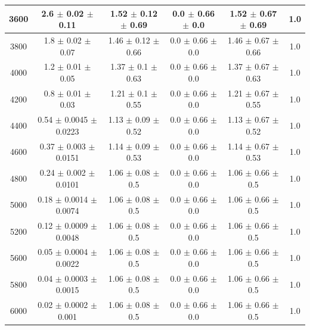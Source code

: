 \begin{table}[htp]
{\begin{tabular}{|c|c|c|c|c|c|}
			3600 & 2.6 $\pm$ 0.02 $\pm$ 0.11 & 1.52 $\pm$ 0.12 $\pm$ 0.69 & 0.0 $\pm$ 0.66 $\pm$ 0.0 & 1.52 $\pm$ 0.67 $\pm$ 0.69 & 1.0     \\ \hline
			3800 & 1.8 $\pm$ 0.02 $\pm$ 0.07 & 1.46 $\pm$ 0.12 $\pm$ 0.66 & 0.0 $\pm$ 0.66 $\pm$ 0.0 & 1.46 $\pm$ 0.67 $\pm$ 0.66 & 1.0     \\ \hline
			4000 & 1.2 $\pm$ 0.01 $\pm$ 0.05 & 1.37 $\pm$ 0.1 $\pm$ 0.63 & 0.0 $\pm$ 0.66 $\pm$ 0.0 & 1.37 $\pm$ 0.67 $\pm$ 0.63 & 1.0     \\ \hline
			4200 & 0.8 $\pm$ 0.01 $\pm$ 0.03 & 1.21 $\pm$ 0.1 $\pm$ 0.55 & 0.0 $\pm$ 0.66 $\pm$ 0.0 & 1.21 $\pm$ 0.67 $\pm$ 0.55 & 1.0     \\ \hline
			4400 & 0.54 $\pm$ 0.0045 $\pm$ 0.0223 & 1.13 $\pm$ 0.09 $\pm$ 0.52 & 0.0 $\pm$ 0.66 $\pm$ 0.0 & 1.13 $\pm$ 0.67 $\pm$ 0.52 & 1.0     \\ \hline
			4600 & 0.37 $\pm$ 0.003 $\pm$ 0.0151 & 1.14 $\pm$ 0.09 $\pm$ 0.53 & 0.0 $\pm$ 0.66 $\pm$ 0.0 & 1.14 $\pm$ 0.67 $\pm$ 0.53 & 1.0     \\ \hline
			4800 & 0.24 $\pm$ 0.002 $\pm$ 0.0101 & 1.06 $\pm$ 0.08 $\pm$ 0.5 & 0.0 $\pm$ 0.66 $\pm$ 0.0 & 1.06 $\pm$ 0.66 $\pm$ 0.5 & 1.0     \\ \hline
			5000 & 0.18 $\pm$ 0.0014 $\pm$ 0.0074 & 1.06 $\pm$ 0.08 $\pm$ 0.5 & 0.0 $\pm$ 0.66 $\pm$ 0.0 & 1.06 $\pm$ 0.66 $\pm$ 0.5 & 1.0     \\ \hline
			5200 & 0.12 $\pm$ 0.0009 $\pm$ 0.0048 & 1.06 $\pm$ 0.08 $\pm$ 0.5 & 0.0 $\pm$ 0.66 $\pm$ 0.0 & 1.06 $\pm$ 0.66 $\pm$ 0.5 & 1.0     \\ \hline
			5600 & 0.05 $\pm$ 0.0004 $\pm$ 0.0022 & 1.06 $\pm$ 0.08 $\pm$ 0.5 & 0.0 $\pm$ 0.66 $\pm$ 0.0 & 1.06 $\pm$ 0.66 $\pm$ 0.5 & 1.0     \\ \hline
			5800 & 0.04 $\pm$ 0.0003 $\pm$ 0.0015 & 1.06 $\pm$ 0.08 $\pm$ 0.5 & 0.0 $\pm$ 0.66 $\pm$ 0.0 & 1.06 $\pm$ 0.66 $\pm$ 0.5 & 1.0     \\ \hline
			6000 & 0.02 $\pm$ 0.0002 $\pm$ 0.001 & 1.06 $\pm$ 0.08 $\pm$ 0.5 & 0.0 $\pm$ 0.66 $\pm$ 0.0 & 1.06 $\pm$ 0.66 $\pm$ 0.5 & 1.0     \\ \hline
	\end{tabular}}
\end{table}

